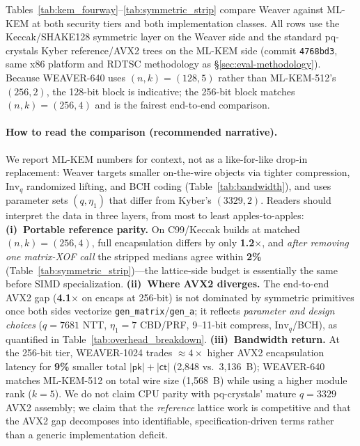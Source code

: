 Tables~\ref{tab:kem_fourway}--\ref{tab:symmetric_strip} compare Weaver against
ML-KEM at both security tiers and both implementation classes.
All rows use the Keccak/SHAKE128 symmetric layer on the Weaver side and the
standard pq-crystals Kyber reference/AVX2 trees on the ML-KEM side
(commit \texttt{4768bd3}, same x86 platform and RDTSC methodology as
\S\ref{sec:eval-methodology}).
Because \textsc{WEAVER-640} uses $(n,k){=}(128,5)$ rather than ML-KEM-512's
$(256,2)$, the 128-bit block is indicative; the 256-bit block matches
$(n,k){=}(256,4)$ and is the fairest end-to-end comparison.

\paragraph{How to read the comparison (recommended narrative).}
We report ML-KEM numbers for context, not as a like-for-like drop-in replacement:
Weaver targets smaller on-the-wire objects via tighter compression, $\mathrm{Inv}_q$
randomized lifting, and BCH coding (Table~\ref{tab:bandwidth}), and uses
parameter sets $(q,\eta_1)$ that differ from Kyber's $(3329,2)$.
Readers should interpret the data in three layers, from most to least apples-to-apples:
\textbf{(i)~Portable reference parity.} On C99/Keccak builds at matched $(n,k){=}(256,4)$,
full encapsulation differs by only \textbf{1.2$\times$}, and \emph{after removing one
matrix-XOF call} the stripped medians agree within \textbf{2\%}
(Table~\ref{tab:symmetric_strip})---the lattice-side budget is essentially the same
before SIMD specialization.
\textbf{(ii)~Where AVX2 diverges.} The end-to-end AVX2 gap (\textbf{4.1$\times$} on
encaps at 256-bit) is not dominated by symmetric primitives once both sides vectorize
\texttt{gen\_matrix}/\texttt{gen\_a}; it reflects \emph{parameter and design choices}
($q{=}7681$ NTT, $\eta_1{=}7$ CBD/PRF, 9--11-bit compress, $\mathrm{Inv}_q$/BCH),
as quantified in Table~\ref{tab:overhead_breakdown}.
\textbf{(iii)~Bandwidth return.} At the 256-bit tier, \textsc{WEAVER-1024} trades
$\approx{}4\times$ higher AVX2 encapsulation latency for \textbf{9\%} smaller total
$|\mathsf{pk}|{+}|\mathsf{ct}|$ (2{,}848 vs.\ 3{,}136~B); \textsc{WEAVER-640} matches
ML-KEM-512 on total wire size (1{,}568~B) while using a higher module rank ($k{=}5$).
We do not claim CPU parity with pq-crystals' mature $q{=}3329$ AVX2 assembly; we claim
that the \emph{reference} lattice work is competitive and that the AVX2 gap decomposes
into identifiable, specification-driven terms rather than a generic implementation deficit.

